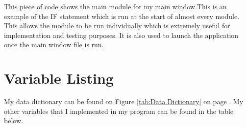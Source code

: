 
This piece of code shows the main module for my main window.This is an example of the IF statement which is run at the start of almost every module. This allows the module to be run individually which is extremely useful for implementation and testing purposes. It is also used to launch the application once the main window file is run.









\section{Variable Listing}

My data dictionary can be found on Figure \ref{tab:Data Dictionary} on page \pageref{tab:Data Dictionary}. My other variables that I implemented in my program can be found in the table below.

